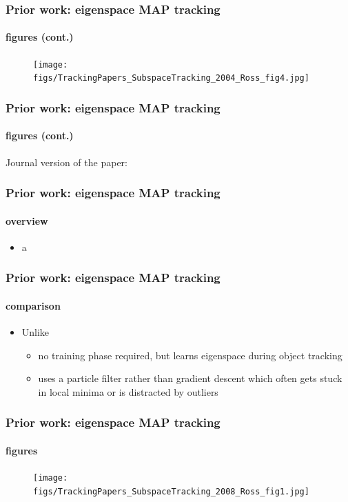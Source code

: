 \begin{frame}
\frametitle{Prior work: eigenspace MAP tracking}
\framesubtitle{figures (cont.)}
\logoCSIPCPL\mypagenum
	\begin{figure}
		\texttt{[image: figs/TrackingPapers\_SubspaceTracking\_2004\_Ross\_fig4.jpg]}
	\end{figure}
\end{frame}


\begin{frame}
\frametitle{Prior work: eigenspace MAP tracking}
\framesubtitle{figures (cont.)}
\logoCSIPCPL\mypagenum
	Journal version of the paper:\\
	\vspace{0.2in}
\end{frame}

\begin{frame}
\frametitle{Prior work: eigenspace MAP tracking}
\framesubtitle{overview}
\logoCSIPCPL\mypagenum
	\begin{itemize}
		\item a
	\end{itemize}
\end{frame}

\begin{frame}
\frametitle{Prior work: eigenspace MAP tracking}
\framesubtitle{comparison}
\logoCSIPCPL\mypagenum
	\begin{itemize}
		\item Unlike 
			\begin{itemize}
				\item no training phase required, but learns eigenspace during object tracking
				\item uses a particle filter rather than gradient descent which often gets stuck in local minima or is distracted by outliers
			\end{itemize}
	\end{itemize}
\end{frame}


\begin{frame}
\frametitle{Prior work: eigenspace MAP tracking}
\framesubtitle{figures}
\logoCSIPCPL\mypagenum
	\begin{figure}
		\texttt{[image: figs/TrackingPapers\_SubspaceTracking\_2008\_Ross\_fig1.jpg]}
	\end{figure}
\end{frame}


